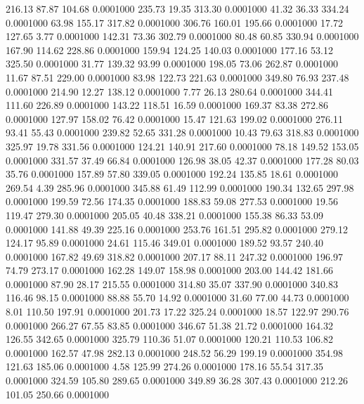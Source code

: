  216.13   87.87  104.68   0.0001000
 235.73   19.35  313.30   0.0001000
  41.32   36.33  334.24   0.0001000
  63.98  155.17  317.82   0.0001000
 306.76  160.01  195.66   0.0001000
  17.72  127.65    3.77   0.0001000
 142.31   73.36  302.79   0.0001000
  80.48   60.85  330.94   0.0001000
 167.90  114.62  228.86   0.0001000
 159.94  124.25  140.03   0.0001000
 177.16   53.12  325.50   0.0001000
  31.77  139.32   93.99   0.0001000
 198.05   73.06  262.87   0.0001000
  11.67   87.51  229.00   0.0001000
  83.98  122.73  221.63   0.0001000
 349.80   76.93  237.48   0.0001000
 214.90   12.27  138.12   0.0001000
   7.77   26.13  280.64   0.0001000
 344.41  111.60  226.89   0.0001000
 143.22  118.51   16.59   0.0001000
 169.37   83.38  272.86   0.0001000
 127.97  158.02   76.42   0.0001000
  15.47  121.63  199.02   0.0001000
 276.11   93.41   55.43   0.0001000
 239.82   52.65  331.28   0.0001000
  10.43   79.63  318.83   0.0001000
 325.97   19.78  331.56   0.0001000
 124.21  140.91  217.60   0.0001000
  78.18  149.52  153.05   0.0001000
 331.57   37.49   66.84   0.0001000
 126.98   38.05   42.37   0.0001000
 177.28   80.03   35.76   0.0001000
 157.89   57.80  339.05   0.0001000
 192.24  135.85   18.61   0.0001000
 269.54    4.39  285.96   0.0001000
 345.88   61.49  112.99   0.0001000
 190.34  132.65  297.98   0.0001000
 199.59   72.56  174.35   0.0001000
 188.83   59.08  277.53   0.0001000
  19.56  119.47  279.30   0.0001000
 205.05   40.48  338.21   0.0001000
 155.38   86.33   53.09   0.0001000
 141.88   49.39  225.16   0.0001000
 253.76  161.51  295.82   0.0001000
 279.12  124.17   95.89   0.0001000
  24.61  115.46  349.01   0.0001000
 189.52   93.57  240.40   0.0001000
 167.82   49.69  318.82   0.0001000
 207.17   88.11  247.32   0.0001000
 196.97   74.79  273.17   0.0001000
 162.28  149.07  158.98   0.0001000
 203.00  144.42  181.66   0.0001000
  87.90   28.17  215.55   0.0001000
 314.80   35.07  337.90   0.0001000
 340.83  116.46   98.15   0.0001000
  88.88   55.70   14.92   0.0001000
  31.60   77.00   44.73   0.0001000
   8.01  110.50  197.91   0.0001000
 201.73   17.22  325.24   0.0001000
  18.57  122.97  290.76   0.0001000
 266.27   67.55   83.85   0.0001000
 346.67   51.38   21.72   0.0001000
 164.32  126.55  342.65   0.0001000
 325.79  110.36   51.07   0.0001000
 120.21  110.53  106.82   0.0001000
 162.57   47.98  282.13   0.0001000
 248.52   56.29  199.19   0.0001000
 354.98  121.63  185.06   0.0001000
   4.58  125.99  274.26   0.0001000
 178.16   55.54  317.35   0.0001000
 324.59  105.80  289.65   0.0001000
 349.89   36.28  307.43   0.0001000
 212.26  101.05  250.66   0.0001000
